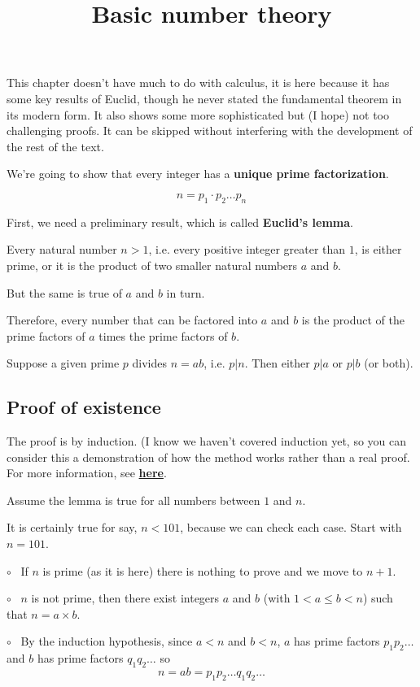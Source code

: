 \documentclass[11pt, oneside]{article}
\title{Basic number theory}
\date{}
\begin{document}
\maketitle
\Large

This chapter doesn't have much to do with calculus, it is here because it has some key results of Euclid, though he never stated the fundamental theorem in its modern form.  It also shows some more sophisticated but (I hope) not too challenging proofs.  It can be skipped without interfering with the development of the rest of the text.

We're going to show that every integer has a \textbf{unique prime factorization}.

\[ n = p_1 \cdot p_2 \dots p_n \]

First, we need a preliminary result, which is called \textbf{Euclid's lemma}.

Every natural number $n > 1$, i.e. every positive integer greater than $1$, is either prime, or it is the product of two smaller natural numbers $a$ and $b$.

But the same is true of $a$ and $b$ in turn.

Therefore, every number that can be factored into $a$ and $b$ is the product of the prime factors of $a$ times the prime factors of $b$.  

Suppose a given prime $p$ divides $n = ab$, i.e. $p|n$. Then either $p|a$ or  $p|b$ (or both).

\subsection*{Proof of existence}

The proof is by induction.  (I know we haven't covered induction yet, so you can consider this a demonstration of how the method works rather than a real proof.   For more information, see \hyperref[sec:induction]{\textbf{here}}.

Assume the lemma is true for all numbers between $1$ and $n$.  

It is certainly true for say, $n < 101$, because we can check each case.  Start with $n = 101$.

$\circ$ \ If $n$ is prime (as it is here) there is nothing to prove and we move to $n + 1$.  

$\circ$ \  $n$ is not prime, then there exist integers $a$ and $b$ (with $1 < a \le b < n$) such that $n = a \times b$.

$\circ$ \ By the induction hypothesis, since $a < n$ and $b < n$, $a$ has prime factors $p_1 p_2 \dots$ and $b$ has prime factors $q_1 q_2 \dots$ so
\[ n = ab = p_1 p_2 \dots q_1 q_2 \dots \]
\end{document}
